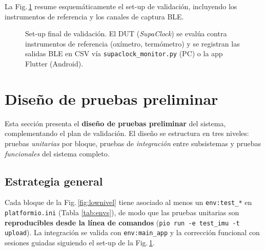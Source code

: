 \documentclass[letterpaper,11pt]{article}
\newcommand{\rfigura}[1]{Fig.\,\ref{#1}}
\newcommand{\rtabla}[1]{Tabla \ref{#1}}
\begin{document}
La \rfigura{fig:setup} resume esquemáticamente el set-up de validación, incluyendo los
instrumentos de referencia y los canales de captura BLE.

\begin{figure}[H]
    \centering
    \resizebox{0.85\linewidth}{!}{}
    \caption{Set-up final de validación. El DUT (\textit{SupaClock}) se evalúa contra
    instrumentos de referencia (oxímetro, termómetro) y se registran las salidas BLE en CSV
    vía \texttt{supaclock\_monitor.py} (PC) o la app Flutter (Android).}
    \label{fig:setup}
\end{figure}

\section{Diseño de pruebas preliminar}
\label{sec:pruebas}
Esta sección presenta el \textbf{diseño de pruebas preliminar} del sistema, complementando
el plan de validación. El diseño se estructura en tres niveles: pruebas \textit{unitarias}
por bloque, pruebas de \textit{integración} entre subsistemas y pruebas \textit{funcionales}
del sistema completo.

\subsection{Estrategia general}
Cada bloque de la \rfigura{fig:lownivel} tiene asociado al menos un \texttt{env:test\_*} en
\texttt{platformio.ini} (\rtabla{tab:envs}), de modo que las pruebas unitarias son
\textbf{reproducibles desde la línea de comandos} (\texttt{pio run -e test\_imu -t upload}).
La integración se valida con \texttt{env:main\_app} y la corrección funcional con sesiones
guiadas siguiendo el set-up de la \rfigura{fig:setup}.
\end{document}
